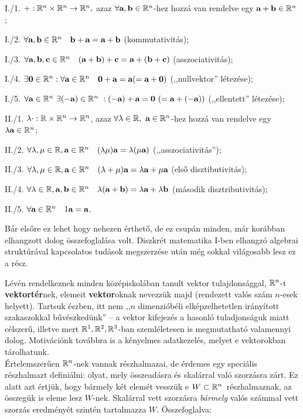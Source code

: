 \documentclass[a4paper,11.5pt]{article}
\begin{document}
	\smallskip
	\noindent I./1. $+: \mathbb{R}^{n} \times  \mathbb{R}^{n}  \rightarrow  \mathbb{R}^{n},$ azaz
	$\forall \textbf{a}, \textbf{b} \in  \mathbb{R}^{n}$-hez hozzá van rendelve egy $\textbf{a} + \textbf{b} \in
	 \mathbb{R}^{n}$ ; 
	
	\smallskip
	\noindent I./2. $\forall \textbf{a}, \textbf{b} \in  \mathbb{R}^{n}  \quad \textbf{b} + \textbf{a} =\textbf{a} +
	\textbf{b}$ (kommutativitás);  
	
	\smallskip
	\noindent I./3. $\forall \textbf{a}, \textbf{b}, \textbf{c} \in  \mathbb{R}^{n}  \quad (\textbf{a} + \textbf{b} )+ \textbf{c} = \textbf{a} +
	(\textbf{b} + \textbf{c})$ (asszociativitás);
	
	\smallskip
	\noindent I./4. $\exists \textbf{0} \in   \mathbb{R}^{n}   :  \forall \textbf{a} \in  \mathbb{R}^{n}  \quad
	\textbf{0}+\textbf{a} =\textbf{a} (=\textbf{a} +\textbf{0})$ (,,nullvektor'' létezése);
	
	\smallskip
	\noindent I./5. $\forall \textbf{a} \in  \mathbb{R}^{n}~ \exists (-\textbf{a} )\in  \mathbb{R}^{n}~   : 
	(-\textbf{a} )+\textbf{a} =\textbf{0}~ (=\textbf{a}+(-\textbf{a} ))$ (,,ellentett'' létezése);
	
	\smallskip
	\noindent II./1. $\lambda \cdot :   \mathbb{R}  \times  \mathbb{R}^{n}  \rightarrow  \mathbb{R}^{n}$, azaz
	$\forall \lambda \in  \mathbb{R},~\textbf{a} \in  \mathbb{R}^{n}$-hez hozzá van rendelve egy $\lambda
	\textbf{a} \in  \mathbb{R}^{n}$; 
	
	\smallskip
	\noindent II./2. $\forall \lambda, \mu \in  \mathbb{R} , \textbf{a} \in  \mathbb{R}^{n}  \quad (\lambda \mu )\textbf{a} =\lambda
	(\mu \textbf{a} )$ (,,asszociativitás'');
	
	\smallskip
	\noindent II./3. $\forall \lambda, \mu \in  \mathbb{R} , \textbf{a} \in  \mathbb{R}^{n}  \quad (\lambda +\mu )\textbf{a} =\lambda
	\textbf{a} +\mu \textbf{a}$ (első disztibutivitás);
	
	\smallskip
	\noindent II./4. $\forall \lambda \in  \mathbb{R} , \textbf{a} , \textbf{b} \in  \mathbb{R}^{n}  \quad \lambda (\textbf{a} +\textbf{b} )=\lambda
	\textbf{a} +\lambda \textbf{b} $ (második disztributivitás);
	
	\smallskip
	\noindent II./5. $\forall \textbf{a} \in  \mathbb{R}^{n}  \quad 1\textbf{a} =\textbf{a} $.
	
	\medskip 
	Bár elsőre ez lehet hogy nehezen érthető, de ez csupán minden, már korábban elhangzott dolog összefoglalása volt. Diszkrét matematika I-ben elhangzó algebrai struktúrával kapcsolatos tudások megszerzése után még sokkal világosabb lesz ez a rész.
	
	Lévén rendelkeznek minden középiskolában tanult vektor tulajdonsággal, $\mathbb{R}^{n}$-t \textbf{vektortér}nek, elemeit \textbf{vektor}oknak nevezzük majd (rendezett valós szám $n$-esek helyett). Tartsuk észben, itt nem ,,$n$ dimenzióbéli elképzelhetetlen irányított szakaszokkal bűvészkedünk'' -- a vektor kifejezés a hasonló tuladjonságuk miatt célszerű, illetve mert $\mathbb{R}^1, \mathbb{R}^2, \mathbb{R}^3$-ban szemléletesen is megmutatható valamennyi dolog. Motivációnk továbbra is a kényelmes adatkezelés, melyet e vektorokban tárolhatunk.\\
	Értelemszerűen $\mathbb{R}^{n}$-nek vannak részhalmazai, de érdemes egy speciális részhalmazt definiálni: olyat, mely összeadásra és skalárral való szorzásra zárt. Ez alatt azt értjük, hogy bármely két elemét vesszük e $W \subset \mathbb{R}^{n}$~részhalmaznak, az összegük is eleme lesz $W$-nek. Skalárral vett szorzásra \emph{bármely} valós számmal vett szorzás eredményét szintén tartalmazza $W$. Összefoglalva:
	
\end{document}
